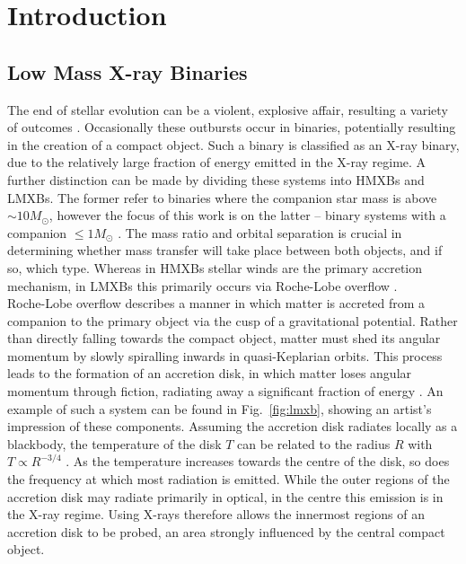 \chapter{Introduction}

\section{Low Mass X-ray Binaries}
The end of stellar evolution can be a violent, explosive affair, resulting a variety of outcomes \citep[see][for a review]{benacquista2012introduction}. Occasionally these outbursts occur in binaries, potentially resulting in the creation of a compact object. Such a binary is classified as an X-ray binary, due to the relatively large fraction of energy emitted in the X-ray regime. A further distinction can be made by dividing these systems into \acp{HMXB} and \acp{LMXB}. The former refer to binaries where the companion star mass is above $\sim\!10 M_\odot$, however the focus of this work is on the latter -- binary systems with a companion $\leq\!1 M_\odot$ \citep{tauris2006formation}. The mass ratio and orbital separation is crucial in determining whether mass transfer will take place between both objects, and if so, which type. Whereas in \acp{HMXB} stellar winds are the primary accretion mechanism, in \acp{LMXB} this primarily occurs via Roche-Lobe overflow \citep{kleinwolt}. \\

Roche-Lobe overflow describes a manner in which matter is accreted from a companion to the primary object via the cusp of a gravitational potential. Rather than directly falling towards the compact object, matter must shed its angular momentum by slowly spiralling inwards in quasi-Keplarian orbits. This process leads to the formation of an accretion disk, in which matter loses angular momentum through fiction, radiating away a significant fraction of energy \citep{frank2002accretion}. An example of such a system can be found in Fig.~\ref{fig:lmxb}, showing an artist's impression of these components. Assuming the accretion disk radiates locally as a blackbody, the temperature of the disk $T$ can be related to the radius $R$ with $T\propto R^{-3/4}$ \citep{shakura1976theory}. As the temperature increases towards the centre of the disk, so does the frequency at which most radiation is emitted. While the outer regions of the accretion disk may radiate primarily in optical, in the centre this emission is in the X-ray regime. Using X-rays therefore allows the innermost regions of an accretion disk to be probed, an area strongly influenced by the central compact object. \\

